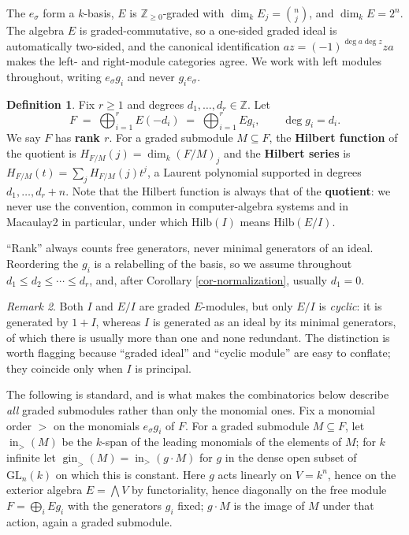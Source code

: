 \documentclass[11pt, a4paper, abstract=yes]{scrartcl}
\theoremstyle{definition}
\newtheorem{definition}{Definition}
\theoremstyle{remark}
\newtheorem{remark}[definition]{Remark}
\theoremstyle{plain}
\newcommand{\inn}{\operatorname{in}}
\newcommand{\gin}{\operatorname{gin}}
\begin{document}
The \(e_\sigma\) form a \(k\)-basis, \(E\) is \(\mathbb Z_{\ge0}\)-graded with
\(\dim_kE_j=\binom nj\), and \(\dim_kE=2^n\). The algebra \(E\) is graded-commutative, so a one-sided graded ideal
is automatically two-sided, and the canonical identification \(az=(-1)^{\deg a\deg z}za\) makes the
left- and right-module categories agree. We work with left modules throughout, writing
\(e_\sigma g_i\) and never \(g_ie_\sigma\).

\begin{definition}
Fix \(r\ge1\) and degrees \(d_1,\dots,d_r\in\mathbb Z\). Let
\begin{equation}\label{eq:free-module}
  F \;=\; \bigoplus_{i=1}^{r}E(-d_i) \;=\; \bigoplus_{i=1}^{r}Eg_i,\qquad \deg g_i=d_i.
\end{equation}
We say \(F\) has \textbf{rank \(r\)}. For a graded submodule \(M\subseteq F\), the \textbf{Hilbert function} of the
quotient is \(H_{F/M}(j)=\dim_k(F/M)_j\) and the \textbf{Hilbert series} is
\(H_{F/M}(t)=\sum_jH_{F/M}(j)t^j\), a Laurent polynomial supported in degrees \(d_1,\dots,d_r+n\).
Note that the Hilbert function is always that of the \textbf{quotient}: we never use the convention, common
in computer-algebra systems and in Macaulay2 in particular, under which \(\mathrm{Hilb}(I)\) means
\(\mathrm{Hilb}(E/I)\).
\label{def-free-module}
\end{definition}

``Rank'' always counts free generators, never minimal generators of an ideal. Reordering the \(g_i\) is
a relabelling of the basis, so we assume throughout \(d_1\le d_2\le\cdots\le d_r\), and, after
Corollary \ref{cor-normalization}, usually \(d_1=0\).

\begin{remark}
Both \(I\) and \(E/I\) are graded \(E\)-modules, but only \(E/I\) is \emph{cyclic}: it is generated by
\(1+I\), whereas \(I\) is generated as an ideal by its minimal generators, of which there is usually
more than one and none redundant. The distinction is worth flagging because ``graded ideal'' and
``cyclic module'' are easy to conflate; they coincide only when \(I\) is principal.
\label{rem-cyclic}
\end{remark}

The following is standard, and is what makes the combinatorics below describe \emph{all} graded
submodules rather than only the monomial ones. Fix a monomial order \(>\) on the monomials
\(e_\sigma g_i\) of \(F\). For a graded submodule \(M\subseteq F\), let \(\inn_>(M)\) be the
\(k\)-span of the leading monomials of the elements of \(M\); for \(k\) infinite let
\(\gin_>(M)=\inn_>(g\cdot M)\) for \(g\) in the dense open subset of \(\mathrm{GL}_n(k)\) on which
this is constant. Here \(g\) acts linearly on \(V=k^n\), hence on the exterior algebra
\(E=\bigwedge V\) by functoriality, hence diagonally on the free module \(F=\bigoplus_iEg_i\) with
the generators \(g_i\) fixed; \(g\cdot M\) is the image of \(M\) under that action, again a graded
submodule.
\end{document}
